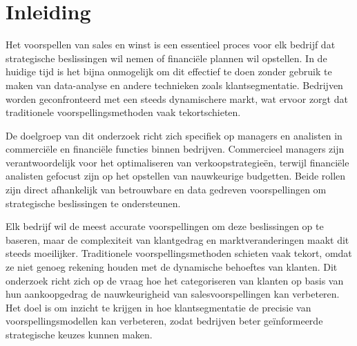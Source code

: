 


% 

\section{Inleiding}%
\label{sec:inleiding}


Het voorspellen van sales en winst is een essentieel proces voor elk bedrijf dat strategische beslissingen wil nemen of financiële plannen wil opstellen. In de huidige tijd is het bijna onmogelijk om dit effectief te doen zonder gebruik te maken van data-analyse en andere technieken zoals klantsegmentatie. Bedrijven worden geconfronteerd met een steeds dynamischere markt, wat ervoor zorgt dat traditionele voorspellingsmethoden vaak tekortschieten. 

De doelgroep van dit onderzoek richt zich specifiek op managers en analisten in commerciële en financiële functies binnen bedrijven. Commercieel managers zijn verantwoordelijk voor het optimaliseren van verkoopstrategieën, terwijl financiële analisten gefocust zijn op het opstellen van nauwkeurige budgetten. Beide rollen zijn direct afhankelijk van betrouwbare en data gedreven voorspellingen om strategische beslissingen te ondersteunen.

Elk bedrijf wil de meest accurate voorspellingen om deze beslissingen op te baseren, maar de complexiteit van klantgedrag en marktveranderingen maakt dit steeds moeilijker. Traditionele voorspellingsmethoden schieten vaak tekort, omdat ze niet genoeg rekening houden met de dynamische behoeftes van klanten. Dit onderzoek richt zich op de vraag hoe het categoriseren van klanten op basis van hun aankoopgedrag de nauwkeurigheid van salesvoorspellingen kan verbeteren. Het doel is om inzicht te krijgen in hoe klantsegmentatie de precisie van voorspellingsmodellen kan verbeteren, zodat bedrijven beter geïnformeerde strategische keuzes kunnen maken.


